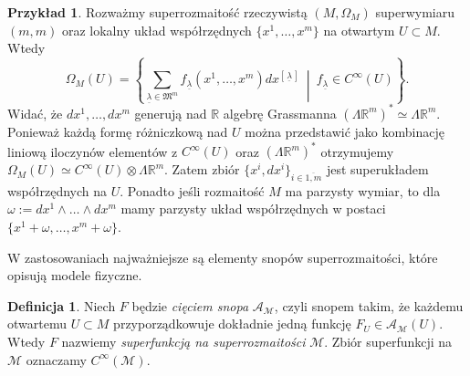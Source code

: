 \documentclass[11pt,a4paper]{report}
\theoremstyle{definition}
\newtheorem{example}[theorem]{Przykład}
\newtheorem{definition}[theorem]{Definicja}
\begin{document}
\begin{example}
	Rozważmy superrozmaitość rzeczywistą $(M, \Omega_M)$ superwymiaru $(m,m)$ oraz lokalny układ współrzędnych $\{x^1, \ldots, x^m \}$ na otwartym $U \subset M$. Wtedy
	\begin{equation*}
		\Omega_M(U) = \left\{ \sum_{\underline{\lambda} \in \mathfrak{M}^m} f_{\underline{\lambda}} (x^1,\ldots,x^m)dx^{\left[ \, \underline{\lambda} \, \right]} \ \middle|\ f_{\underline{\lambda}} \in C^\infty(U) \right\}.
	\end{equation*}
	Widać, że $dx^1, \ldots, dx^m$ generują nad $\mathbb{R}$ algebrę Grassmanna $(\Lambda \mathbb{R}^m)^* \simeq \Lambda \mathbb{R}^m$. Ponieważ każdą formę różniczkową nad $U$ można przedstawić jako kombinację liniową iloczynów elementów z $C^{\infty}(U)$ oraz $(\Lambda \mathbb{R}^m)^*$ otrzymujemy $\Omega_M(U) \simeq C^{\infty}(U) \otimes \Lambda \mathbb{R}^m$. Zatem zbiór $\{ x^i, dx^i \}_{i \in \overline{1,m}}$ jest superukładem współrzędnych na $U$. Ponadto jeśli rozmaitość $M$ ma parzysty wymiar, to dla $\omega := dx^1 \wedge \ldots \wedge dx^m$ mamy parzysty układ współrzędnych w postaci $\{x^1 + \omega, \ldots, x^m +\omega \}$.
\end{example}

W zastosowaniach najważniejsze są elementy snopów superrozmaitości, które opisują modele fizyczne.

\begin{definition}
	Niech $F$ będzie \textit{cięciem snopa} $\mathcal{A_M}$, czyli snopem takim, że każdemu otwartemu $U \subset M$ przyporządkowuje dokładnie jedną funkcję $F_U \in \mathcal{A}_\mathcal{M} (U)$. Wtedy $F$ nazwiemy \textit{superfunkcją na superrozmaitości} $\mathcal{M}$. Zbiór superfunkcji na $\mathcal{M}$ oznaczamy $C^\infty(\mathcal{M})$.
\end{definition}
\end{document}
